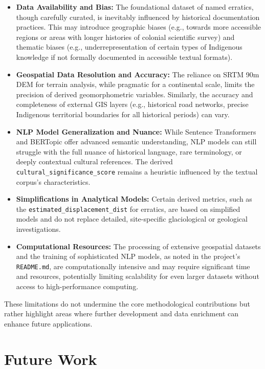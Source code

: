 \documentclass[
11pt, %
english, %
singlespacing, %
headsepline, %
]{MastersDoctoralThesis} %
\begin{document}
\begin{itemize}
    \item \textbf{Data Availability and Bias:} The foundational dataset of named erratics, though carefully curated, is inevitably influenced by historical documentation practices. This may introduce geographic biases (e.g., towards more accessible regions or areas with longer histories of colonial scientific survey) and thematic biases (e.g., underrepresentation of certain types of Indigenous knowledge if not formally documented in accessible textual formats).
    \item \textbf{Geospatial Data Resolution and Accuracy:} The reliance on SRTM 90m DEM for terrain analysis, while pragmatic for a continental scale, limits the precision of derived geomorphometric variables. Similarly, the accuracy and completeness of external GIS layers (e.g., historical road networks, precise Indigenous territorial boundaries for all historical periods) can vary.
    \item \textbf{NLP Model Generalization and Nuance:} While Sentence Transformers and BERTopic offer advanced semantic understanding, NLP models can still struggle with the full nuance of historical language, rare terminology, or deeply contextual cultural references. The derived \texttt{cultural\_significance\_score} remains a heuristic influenced by the textual corpus's characteristics.
    \item \textbf{Simplifications in Analytical Models:} Certain derived metrics, such as the \texttt{estimated\_displacement\_dist} for erratics, are based on simplified models and do not replace detailed, site-specific glaciological or geological investigations.
    \item \textbf{Computational Resources:} The processing of extensive geospatial datasets and the training of sophisticated NLP models, as noted in the project's \texttt{README.md}, are computationally intensive and may require significant time and resources, potentially limiting scalability for even larger datasets without access to high-performance computing.
\end{itemize}
These limitations do not undermine the core methodological contributions but rather highlight areas where further development and data enrichment can enhance future applications.

\section{Future Work}
\label{sec:future_work}
\end{document}
